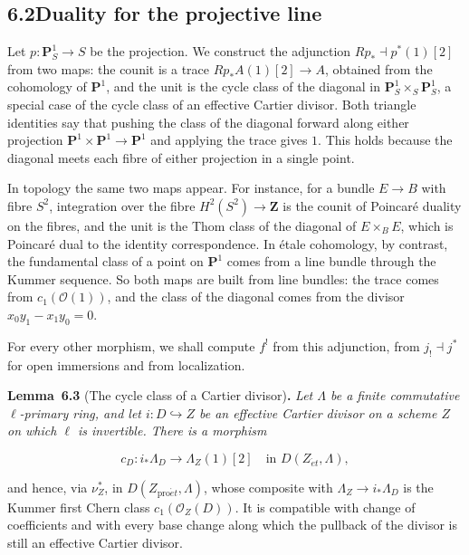 \documentclass[11pt]{article}
\newenvironment{bpstatement}[2]{\par\addvspace{0.6\baselineskip}\noindent\textbf{#1}#2\textbf{.}\enspace\ignorespaces}
  {\par\addvspace{0.4\baselineskip}}
\newenvironment{bpstatementit}[2]{\begin{bpstatement}{#1}{#2}\itshape\ignorespaces}{\end{bpstatement}}
\begin{document}
\subsection*{\texorpdfstring{6.2\quad Duality for the projective line}{6.2 Duality for the projective line}}
\label{bp521}%
\label{bp522}%
Let \(p:\mathbf P^1_S\to S\) be the projection. We construct the adjunction \(Rp_*\dashv p^*(1)[2]\) from two maps: the counit is a trace \(Rp_*A(1)[2]\to A\), obtained from the cohomology of \(\mathbf P^1\), and the unit is the cycle class of the diagonal in \(\mathbf P^1_S\times_S\mathbf P^1_S\), a special case of the cycle class of an effective Cartier divisor. Both triangle identities say that pushing the class of the diagonal forward along either projection \(\mathbf P^1\times\mathbf P^1\to\mathbf P^1\) and applying the trace gives \(1\). This holds because the diagonal meets each fibre of either projection in a single point.

In topology the same two maps appear. For instance, for a bundle \(E\to B\) with fibre \(S^2\), integration over the fibre \(H^2(S^2)\to\mathbf Z\) is the counit of Poincaré duality on the fibres, and the unit is the Thom class of the diagonal of \(E\times_BE\), which is Poincaré dual to the identity correspondence. In étale cohomology, by contrast, the fundamental class of a point on \(\mathbf P^1\) comes from a line bundle through the Kummer sequence. So both maps are built from line bundles: the trace comes from \(c_1(\mathcal O(1))\), and the class of the diagonal comes from the divisor \(x_0y_1-x_1y_0=0\).

For every other morphism, we shall compute \(f^!\) from this adjunction, from \(j_!\dashv j^*\) for open immersions and from localization.

\label{bp523}%
\begin{bpstatementit}{Lemma~6.3}{ (The cycle class of a Cartier divisor)}
Let \(\Lambda\) be a finite commutative \(\ell\)-primary ring, and let \(i:D\hookrightarrow Z\) be an effective Cartier divisor on a scheme \(Z\) on which \(\ell\) is invertible. There is a morphism

\[
c_D:i_*\Lambda_D\longrightarrow\Lambda_Z(1)[2]\quad\text{in }D(Z_{\acute{e}t},\Lambda),
\]

and hence, via \(\nu_Z^*\), in \(D(Z_{\mathrm{pro}\acute{e}t},\Lambda)\), whose composite with \(\Lambda_Z\to i_*\Lambda_D\) is the Kummer first Chern class \(c_1(\mathcal O_Z(D))\). It is compatible with change of coefficients and with every base change along which the pullback of the divisor is still an effective Cartier divisor.
\end{bpstatementit}
\end{document}
